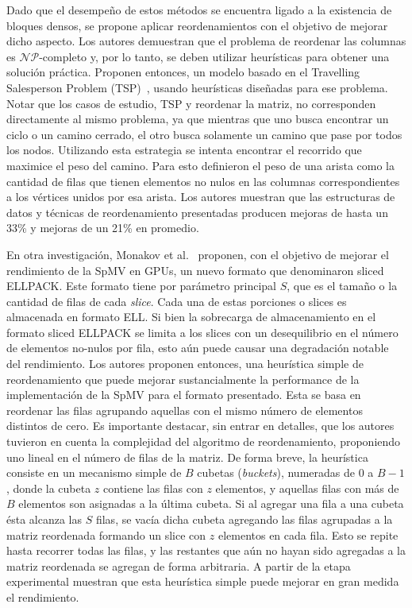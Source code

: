 Dado que el desempeño de estos métodos se encuentra ligado a la existencia de bloques densos, se propone aplicar reordenamientos con el objetivo de mejorar dicho aspecto. 
Los autores demuestran que el problema de reordenar las columnas es $\mathcal{NP}$-completo y, por lo tanto, se deben utilizar heurísticas para obtener una solución práctica. Proponen entonces, un modelo basado en el Travelling Salesperson Problem (TSP)~\cite{reinelt1994}, usando heurísticas diseñadas para ese problema. Notar que los casos de estudio, TSP y reordenar la matriz, no corresponden directamente al mismo problema, ya que mientras que uno busca encontrar un ciclo o un camino cerrado, el otro busca solamente un camino que pase por todos los nodos. 
Utilizando esta estrategia se intenta encontrar el recorrido que maximice el peso del camino. Para esto definieron el peso de una arista como la cantidad de filas que tienen elementos no nulos en las columnas correspondientes a los vértices unidos por esa arista. Los autores muestran que las  estructuras de datos y técnicas de reordenamiento presentadas producen mejoras de hasta un 33\% y mejoras de un 21\% en promedio.

En otra investigación, Monakov et al.~\cite{Monakov2010} proponen, con el objetivo de mejorar el rendimiento de la SpMV en GPUs, un nuevo formato que denominaron sliced ELLPACK. Este formato tiene por parámetro principal $S$, que es el tamaño o la cantidad de filas de cada \textit{slice}. Cada una de estas porciones o slices es almacenada en formato ELL.  
Si bien la sobrecarga de almacenamiento en el formato sliced ELLPACK se limita a los slices con un desequilibrio en el número de elementos no-nulos por fila, esto aún puede causar una degradación notable del rendimiento. Los autores proponen entonces, una heurística simple de reordenamiento que puede mejorar sustancialmente la performance de la implementación de la SpMV para el formato presentado. Esta se basa en reordenar las filas agrupando aquellas con el mismo número de elementos distintos de cero. %
Es importante destacar, sin entrar en detalles, que los autores tuvieron en cuenta la complejidad del algoritmo de reordenamiento, proponiendo uno lineal en el número de filas de la matriz. 
De forma breve, la heurística consiste en un mecanismo simple de $B$ cubetas (\textit{buckets}), numeradas de $0$ a $B - 1$, donde la cubeta $z$ contiene las filas con $z$ elementos, y aquellas filas con más de $B$ elementos son asignadas a la última cubeta. Si al agregar una fila a una cubeta ésta alcanza las $S$ filas, se vacía dicha cubeta agregando las filas agrupadas a la matriz reordenada formando un slice con $z$ elementos en cada fila. Esto se repite hasta recorrer todas las filas, y las restantes que aún no hayan sido agregadas a la matriz reordenada se agregan de forma arbitraria.
A partir de la etapa experimental muestran que esta heurística simple puede mejorar en gran medida el rendimiento. 



